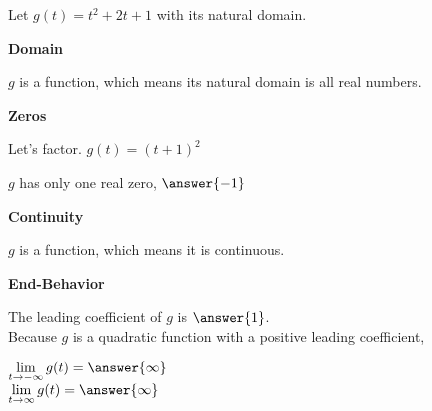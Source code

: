 \documentclass{ximera}
\author{Lee Wayand}
\begin{document}
\begin{exercise} 




Let $g(t) = t^2 + 2t + 1$ with its natural domain. \\




\begin{question}  \textbf{\textcolor{blue!55!black}{Domain}}


$g$ is a  function, which means its natural domain is all real numbers.

\end{question}








\begin{question}  \textbf{\textcolor{blue!55!black}{Zeros}}


Let's factor.  $g(t) = (t+1)^2$ 


$g$ has only one real zero, $\answer{-1}$


\end{question}







\begin{question}  \textbf{\textcolor{blue!55!black}{Continuity}}


$g$ is a  function, which means it is continuous.

\end{question}









\begin{question}  \textbf{\textcolor{blue!55!black}{End-Behavior}}


The leading coefficient of $g$ is $\answer{1}$. \\


Because $g$ is a quadratic function with a positive leading coefficient,

$\lim\limits_{t \to -\infty} g(t) = \answer{\infty}$ \\


$\lim\limits_{t \to \infty} g(t) = \answer{\infty}$ \\


\end{question}
\end{exercise}
\end{document}
